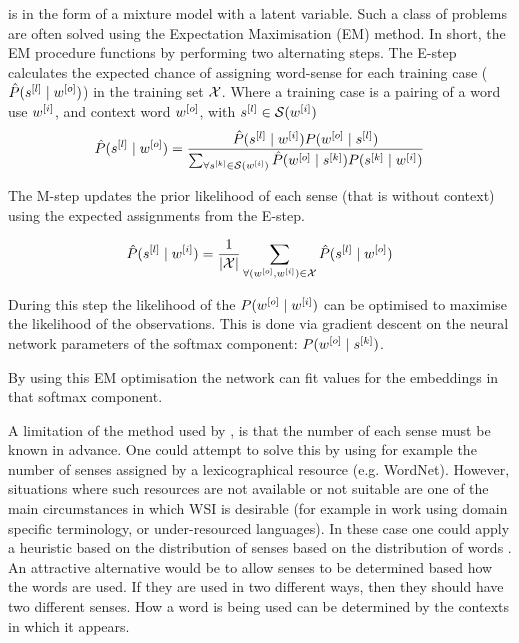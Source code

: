 \documentclass[12pt,parskip]{komatufte}
\begin{document}
 is in the form of a mixture model with a latent variable.
Such a class of problems are often solved using the Expectation Maximisation (EM) method.
In short, the EM procedure functions by performing two alternating steps.
The E-step calculates the expected chance of assigning word-sense for each training case ($\hat{P}(\n s_l \mid \n w_o)$) in the training set $\mathcal{X}$.
Where a training case is a pairing of a word use $\n w_i$, and context word $\n w_o$, with $\n s_l\in \seq S(\n w_i)$
\begin{align}
\hat{P}(\n s_l \mid \n w_o) = \frac{\hat{P}(\n s_l \mid \n w_i) P(\n w_o \mid \n s_l)}{\sum_{\forall \n s_k \in \seq S(\n w_i)} \hat{P}(\n w_o \mid \n s_k) P(\n s_k \mid \n w_i)}
\end{align}

The M-step updates the prior likelihood of each sense (that is without context) using the expected assignments from the E-step.

\begin{align}
\hat{P}(\n s_l \mid \n w_i) = \frac{1}{\left|\seq X\right|} \sum_{\forall (\n w_o,\n w_i)\in \seq X} \hat{P}(\n s_l \mid \n w_o)
\end{align}

During this step the likelihood of the $P(\n w_o \mid \n w_i)$ can be optimised to maximise the likelihood of the observations.
This is done via gradient descent on the neural network parameters of the softmax component: $P(\n w_o \mid \n s_k)$.

By using this EM optimisation the network can fit values for the embeddings in that softmax component.


A limitation of the method used by , is that the number of each sense must be known in advance.
One could attempt to solve this by using for example the number of senses assigned by a lexicographical resource (e.g. WordNet).
However, situations where such resources are not available or not suitable are one of the main circumstances in which WSI is desirable  (for example in work using domain specific terminology, or under-resourced languages).
In these case one could apply a heuristic based on the distribution of senses based on the distribution of words \parencite{zipf1945meaning}.
An attractive alternative would be to allow senses to be determined based how the words are used. If they are used in two different ways, then they should have two different senses.
How a word is being used can be determined by the contexts in which it appears.
\end{document}
